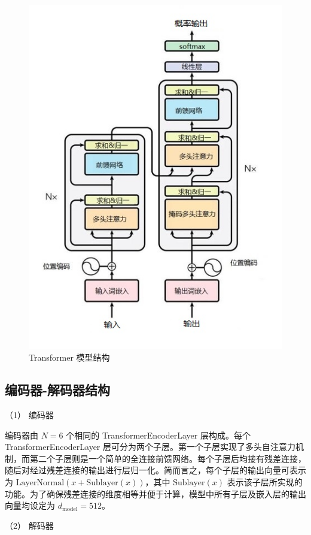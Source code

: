 \begin{figure}[htb]
	\centering
	\includegraphics[scale = 0.8]{figures/Transformer2}
	\caption{Transformer 模型结构 \cite{transformer}}
	\label{fig:Transformer2}
\end{figure}

\subsection{编码器-解码器结构}

（1） 编码器

编码器由 \(N=6\) 个相同的 TransformerEncoderLayer 层构成。每个 TransformerEncoderLayer 层可分为两个子层。第一个子层实现了多头自注意力机制，而第二个子层则是一个简单的全连接前馈网络。每个子层后均接有残差连接，随后对经过残差连接的输出进行层归一化。简而言之，每个子层的输出向量可表示为 \(\text{LayerNormal}(x + \text{Sublayer}(x))\)，其中 \(\text{Sublayer}(x)\) 表示该子层所实现的功能。为了确保残差连接的维度相等并便于计算，模型中所有子层及嵌入层的输出向量均设定为 \(d_{\text{model}} = 512\)。

（2） 解码器

